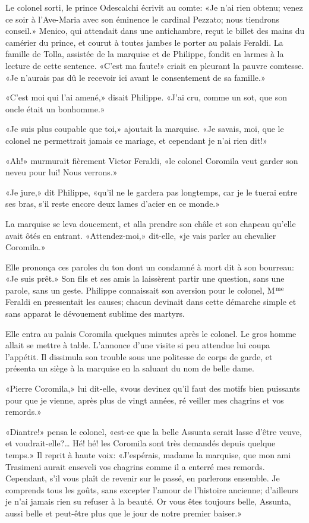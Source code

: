 Le colonel sorti, le prince Odescalchi écrivit au comte: «Je n'ai rien obtenu; venez ce soir à l'Ave-Maria avec son éminence le cardinal Pezzato; nous tiendrons conseil.» Menico, qui attendait dans une antichambre, reçut le billet des mains du camérier du prince, et courut à toutes jambes le porter au palais Feraldi. La famille de Tolla, assistée de la marquise et de Philippe, fondit en larmes à la lecture de cette sentence. «C'est ma faute!» criait en pleurant la pauvre comtesse. «Je n'aurais pas dû le recevoir ici avant le consentement de sa famille.»

«C'est moi qui l'ai amené,» disait Philippe. «J'ai cru, comme un sot, que son oncle était un bonhomme.»

«Je suis plus coupable que toi,» ajoutait la marquise. «Je savais, moi, que le colonel ne permettrait jamais ce mariage, et cependant je n'ai rien dit!»

«Ah!» murmurait fièrement Victor Feraldi, «le colonel Coromila veut garder son neveu pour lui! Nous verrons.»

«Je jure,» dit Philippe, «qu'il ne le gardera pas longtemps, car je le tuerai entre ses bras, s'il reste encore deux lames d'acier en ce monde.»

La marquise se leva doucement, et alla prendre son châle et son chapeau qu'elle avait ôtés en entrant. «Attendez-moi,» dit-elle, «je vais parler au chevalier Coromila.»

Elle prononça ces paroles du ton dont un condamné à mort dit à son bourreau: «Je suis prêt.» Son fils et ses amis la laissèrent partir une question, sans une parole, sans un geste. Philippe connaissait son aversion pour le colonel, M$\textsuperscript{me}$ Feraldi en pressentait les causes; chacun devinait dans cette démarche simple et sans apparat le dévouement sublime des martyrs.

Elle entra au palais Coromila quelques minutes après le colonel. Le gros homme allait se mettre à table. L'annonce d'une visite si peu attendue lui coupa l'appétit. Il dissimula son trouble sous une politesse de corps de garde, et présenta un siège à la marquise en la saluant du nom de belle dame.

\enlargethispage{3em}

«Pierre Coromila,» lui dit-elle, «vous devinez qu'il faut des motifs bien puissants pour que je vienne, après plus de vingt années, ré veiller mes chagrins et vos remords.»

«Diantre!» pensa le colonel, «est-ce que la belle Assunta serait lasse d'être veuve, et voudrait-elle?\ldots{} Hé! hé! les Coromila sont très demandés depuis quelque temps.» Il reprit à haute voix: «J'espérais, madame la marquise, que mon ami Trasimeni aurait enseveli vos chagrins comme il a enterré mes remords. Cependant, s'il vous plaît de revenir sur le passé, en parlerons ensemble. Je comprends tous les goûts, sans excepter l'amour de l'histoire ancienne; d'ailleurs je n'ai jamais rien su refuser à la beauté. Or vous êtes toujours belle, Assunta, aussi belle et peut-être plus que le jour de notre premier baiser.»

